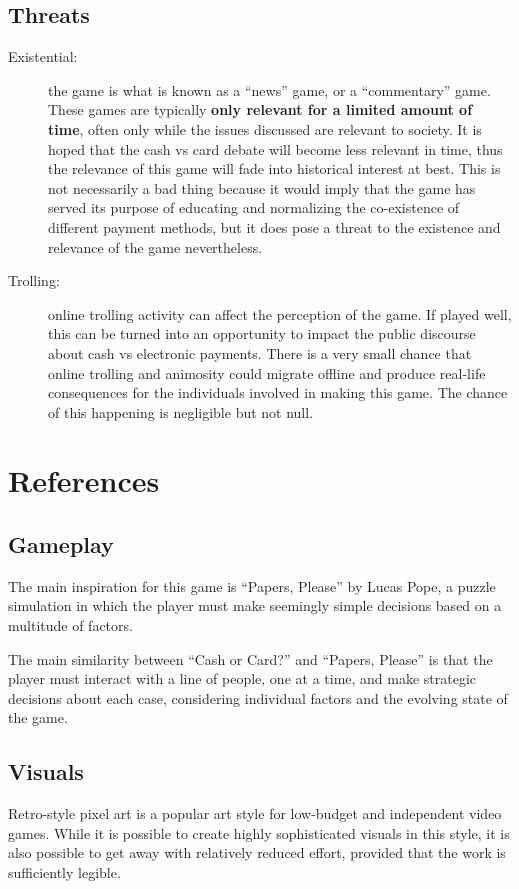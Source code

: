 \documentclass[a4paper,11pt]{article}
\begin{document}
\subsection{Threats}
\begin{description}
  \item[Existential:] the game is what is known as a ``news'' game, or a ``commentary'' game. These games are typically \textbf{only relevant for a limited amount of time}, often only while the issues discussed are relevant to society. It is hoped that the cash vs card debate will become less relevant in time, thus the relevance of this game will fade into historical interest at best. This is not necessarily a bad thing because it would imply that the game has served its purpose of educating and normalizing the co-existence of different payment methods, but it does pose a threat to the existence and relevance of the game nevertheless.
  \item[Trolling:] online trolling activity can affect the perception of the game. If played well, this can be turned into an opportunity to impact the public discourse about cash vs electronic payments. There is a very small chance that online trolling and animosity could migrate offline and produce real-life consequences for the individuals involved in making this game. The chance of this happening is negligible but not null.
\end{description}

\section{References}
\subsection{Gameplay}
The main inspiration for this game is ``Papers, Please'' by Lucas Pope, a puzzle simulation in which the player must make seemingly simple decisions based on a multitude of factors.

The main similarity between ``Cash or Card?'' and ``Papers, Please'' is that the player must interact with a line of people, one at a time, and make strategic decisions about each case, considering individual factors and the evolving state of the game.

\subsection{Visuals}
Retro-style pixel art is a popular art style for low-budget and independent video games. While it is possible to create highly sophisticated visuals in this style, it is also possible to get away with relatively reduced effort, provided that the work is sufficiently legible.
\end{document}
